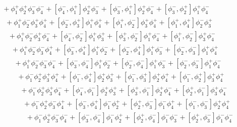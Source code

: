 {\begin{align*}
        &\hspace{15pt}+\phi_1^+ \phi_2^+ \phi_3^- \phi_4^-+ \left[\phi_4^-, \phi_1^+\right] \phi_2^+ \phi_3^-+ \left[\phi_3^-, \phi_1^+\right] \phi_2^+ \phi_4^-+ \left[\phi_3^-, \phi_2^+\right] \phi_1^+ \phi_4^-\\[5pt]
        &\hspace{20pt}+\phi_1^+ \phi_2^- \phi_3^+ \phi_4^++ \left[\phi_2^-, \phi_3^+\right] \phi_1^+ \phi_4^++ \left[\phi_1^+, \phi_2^-\right] \phi_3^+ \phi_4^++ \left[\phi_1^+, \phi_4^+\right] \phi_2^- \phi_3^+\\[5pt]
        &\hspace{25pt}+\phi_1^+ \phi_2^- \phi_3^+ \phi_4^-+ \left[\phi_4^-, \phi_2^-\right] \phi_1^+ \phi_3^++ \left[\phi_3^+, \phi_2^-\right] \phi_1^+ \phi_4^-+ \left[\phi_1^+, \phi_2^-\right] \phi_3^+ \phi_4^-\\[5pt]
        &\hspace{30pt}+\phi_1^+ \phi_2^- \phi_3^- \phi_4^++\left[\phi_3^-, \phi_4^+\right] \phi_1^+ \phi_2^-+\left[\phi_2^-, \phi_4^+\right] \phi_1^+ \phi_3^-+\left[\phi_2^-, \phi_3^- \right] \phi_1^+ \phi_4^+\\[5pt]
        &\hspace{35pt}+\phi_1^+ \phi_2^- \phi_3^- \phi_4^-+\left[\phi_3^-, \phi_4^-\right] \phi_1^+ \phi_2^-+\left[\phi_2^-, \phi_4^-\right] \phi_1^+ \phi_3^-+\left[\phi_2^-, \phi_3^- \right] \phi_1^+ \phi_4^-\\[5pt]
        &\hspace{40pt}+\phi_1^- \phi_2^+ \phi_3^+ \phi_4^+ +\left[\phi_1^-, \phi_4^+\right] \phi_2^+ \phi_3^++\left[\phi_1^-, \phi_3^+\right] \phi_2^+ \phi_4^++\left[\phi_1^-, \phi_2^+\right] \phi_3^+ \phi_4^+\\[5pt]
        &\hspace{45pt}+\phi_1^- \phi_2^+ \phi_3^+ \phi_4^-+\left[\phi_4^-, \phi_1^-\right] \phi_2^+ \phi_3^++\left[\phi_3^+, \phi_1^-\right] \phi_2^+ \phi_4^-+\left[\phi_2^+, \phi_1^-\right] \phi_3^+ \phi_4^-\\[5pt]
        &\hspace{50pt}+\phi_1^- \phi_2^+ \phi_3^- \phi_4^++ \left[\phi_3^-, \phi_4^+\right] \phi_1^- \phi_2^++ \left[\phi_2^+, \phi_3^-\right] \phi_1^- \phi_4^++ \left[\phi_1^-, \phi_3^-\right] \phi_2^+ \phi_4^+\\[5pt]
        &\hspace{55pt}+\phi_1^- \phi_2^+ \phi_3^- \phi_4^-+ \left[\phi_3^-, \phi_4^-\right] \phi_1^- \phi_2^++ \left[\phi_2^+, \phi_4^-\right] \phi_1^- \phi_3^-+ \left[\phi_2^+, \phi_3^- \right] \phi_1^- \phi_4^-\\[5pt]

\end{align*}}
